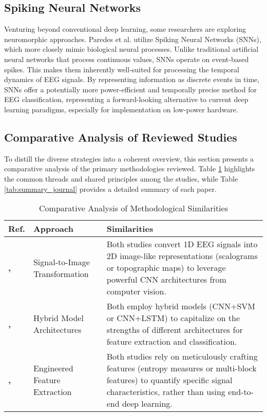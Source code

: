 \documentclass[conference]{IEEEtran}
\begin{document}
\subsection{Spiking Neural Networks}
Venturing beyond conventional deep learning, some researchers are exploring neuromorphic approaches. Paredes et al. \cite{b5} utilize Spiking Neural Networks (SNNs), which more closely mimic biological neural processes. Unlike traditional artificial neural networks that process continuous values, SNNs operate on event-based spikes. This makes them inherently well-suited for processing the temporal dynamics of EEG signals. By representing information as discrete events in time, SNNs offer a potentially more power-efficient and temporally precise method for EEG classification, representing a forward-looking alternative to current deep learning paradigms, especially for implementation on low-power hardware.

\subsection{Comparative Analysis of Reviewed Studies}
To distill the diverse strategies into a coherent overview, this section presents a comparative analysis of the primary methodologies reviewed. Table \ref{tab:method_similarities} highlights the common threads and shared principles among the studies, while Table \ref{tab:summary_journal} provides a detailed summary of each paper.

\begin{table}[htbp]
\centering
\scriptsize
\caption{Comparative Analysis of Methodological Similarities}
\label{tab:method_similarities}
\renewcommand{\arraystretch}{3}
\begin{tabular}{p{1.5cm}p{2.5cm}p{4.5cm}}
\hline
\textbf{Ref.} & \textbf{Approach} & \textbf{Similarities} \\
\hline
\textbf{\cite{b1}, \cite{b2}}
& Signal-to-Image Transformation
& Both studies convert 1D EEG signals into 2D image-like representations (scalograms or topographic maps) to leverage powerful CNN architectures from computer vision. \\[1mm]
\textbf{\cite{b1}, \cite{b2}}
& Hybrid Model Architectures
& Both employ hybrid models (CNN+SVM or CNN+LSTM) to capitalize on the strengths of different architectures for feature extraction and classification. \\[1mm]
\textbf{\cite{b3}, \cite{b4}}
& Engineered Feature Extraction
& Both studies rely on meticulously crafting features (entropy measures or multi-block features) to quantify specific signal characteristics, rather than using end-to-end deep learning. \\
\hline
\end{tabular}
\end{table}
\end{document}
